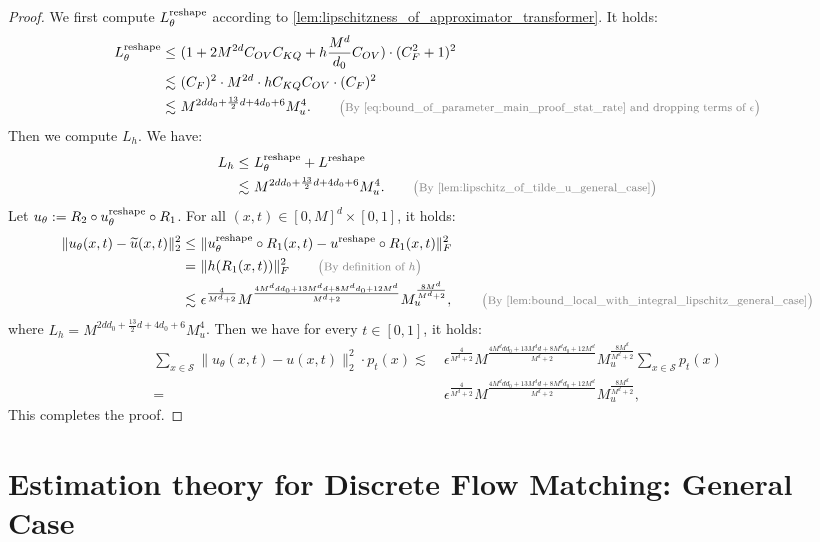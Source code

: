 \documentclass[12pt]{article}
\numberwithin{equation}{section}
\let\tilde\widetilde
\newcommand{\wt}{\widetilde}
\renewcommand{\tilde}{\wt}
\theoremstyle{theoremstyle}
\numberwithin{equation}{section}
\numberwithin{theorem}{section}
\numberwithin{proposition}{section}
\numberwithin{definition}{section}
\numberwithin{lemma}{section}
\numberwithin{assumption}{section}
\numberwithin{remark}{section}
\newcommand*{\annot}[1]{\tag*{\footnotesize{\textcolor{black!50}{\big(#1\big)}}}}
\begin{document}
\begin{proof}
We first compute $L_\theta^{\rm reshape}$ according to \cref{lem:lipschitzness_of_approximator_transformer}.
It holds:
\begin{align*}
    L_\theta^{\rm reshape}\leq & ~
    (1+2M^{2d}C_{OV}C_{KQ}+h\frac{M^d}{d_0}C_{OV})\cdot(C_F^2+1)^2\\
    \lesssim & ~
    (C_F)^2\cdot M^{2d}\cdot h C_{KQ}C_{OV}\cdot(C_F)^2 \\
    \lesssim & ~
    M^{2dd_0+\frac{13}{2}d+4d_0+6}M_u^4. \annot{By \eqref{eq:bound_of_parameter_main_proof_stat_rate} and dropping terms of $\epsilon$}
\end{align*}
Then we compute $L_h$. 
We have:
\begin{align*}
    L_h\leq & ~
    L_\theta^{\rm reshape}+L^{\rm reshape}\\
    \lesssim & ~
    M^{2dd_0+\frac{13}{2}d+4d_0+6}M_u^4.  \annot{By \cref{lem:lipschitz_of_tilde_u_general_case}}
\end{align*}
Let $u_\theta:=R_2\circ u_\theta^{\rm reshape}\circ R_1$.
For all $(x,t)\in[0,M]^d\times[0,1]$, it holds:
\begin{align*}
    \|u_\theta(x,t)-\tilde{u}(x,t)\|^2_2\leq & ~
    \|u_\theta^{\rm reshape}\circ R_1(x,t)-u^{\rm reshape}\circ R_1(x,t)\|^2_F \\
    = & ~
    \|h(R_1(x,t))\|^2_F 
    \annot{By definition of $h$}\\
    \lesssim & ~
    \epsilon^\frac{4}{M^d+2}M^{\frac{4M^ddd_0+13M^dd+8M^dd_0+12M^d}{M^d+2}}M_u^{\frac{8M^d}{M^d+2}}, \annot{By \cref{lem:bound_local_with_integral_lipschitz_general_case}}
\end{align*}
where $L_h=M^{2dd_0+\frac{13}{2}d+4d_0+6}M_u^4$.
Then we have for every $t\in[0,1]$, it holds:
\begin{align*}
    \sum_{x\in \mathcal{S}}\|u_\theta(x,t)-u(x,t)\|^2_2\cdot p_t(x) 
    \lesssim & ~
    \epsilon^\frac{4}{M^d+2}M^{\frac{4M^ddd_0+13M^dd+8M^dd_0+12M^d}{M^d+2}}M_u^{\frac{8M^d}{M^d+2}} \sum_{x\in \mathcal{S}}p_t(x)\\
    = & ~
    \epsilon^\frac{4}{M^d+2}M^{\frac{4M^ddd_0+13M^dd+8M^dd_0+12M^d}{M^d+2}}M_u^{\frac{8M^d}{M^d+2}},
\end{align*}
This completes the proof.
\end{proof}




\section{Estimation theory for Discrete Flow Matching: General Case}
\label{sec:estimation_dfm_general}
\end{document}
